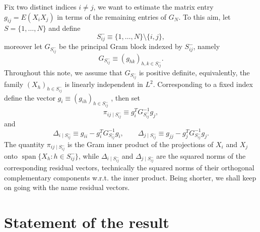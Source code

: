 \documentclass[11pt]{article}
\begin{document}
Fix two distinct indices $i\neq j$, we want to estimate the matrix entry ${g}_{ij}=E(X_iX_j)$ in terms of the remaining entries of $G_N$. To this aim, let $S=\{1,\ldots,N\}$ and define
\begin{equation}
S^{-}_{ij}\equiv \{1,\dots,N\}\setminus\{i,j\},
\end{equation}
moreover let $G_{S^{-}_{ij}}$ be the principal Gram block indexed by $S^{-}_{ij}$, namely
\begin{equation}
G_{S^{-}_{ij}}\equiv ({g}_{hk})_{h,k\in S^{-}_{ij}}.
\end{equation}
Throughout this note, we assume that $G_{S^{-}_{ij}}$ is positive definite, equivalently, the family $(X_h)_{h\in S^{-}_{ij}}$ is linearly independent in $L^2$.
Corresponding to a fixed index define the vector $g_i\equiv ({g}_{ih})_{h\in S^{-}_{ij}}$ , then set
\begin{equation}
\pi_{ij\mid S^{-}_{ij}}\equiv g_i^TG_{S^{-}_{ij}}^{-1}g_j,
\end{equation}
and
\begin{equation}
\Delta_{i\mid S^{-}_{ij}}\equiv {g}_{ii}-g_i^TG_{S^{-}_{ij}}^{-1}g_i,
\qquad
\Delta_{j\mid S^{-}_{ij}}\equiv {g}_{jj}-g_j^TG_{S^{-}_{ij}}^{-1}g_j.
\end{equation}
The quantity $\pi_{ij\mid S^{-}_{ij}}$ is the Gram inner product of the projections of $X_i$ and $X_j$ onto $\operatorname{span}\{X_h:h\in S^{-}_{ij}\}$, while $\Delta_{i\mid S^{-}_{ij}}$ and $\Delta_{j\mid S^{-}_{ij}}$ are the squared norms of the corresponding residual vectors, technically the squared norms of their orthogonal complementary components w.r.t. the inner product. Being shorter, we shall keep on going with the name residual vectors.

\section{Statement of the result}
\end{document}
